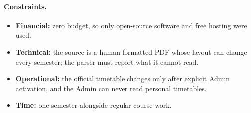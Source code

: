 \paragraph{Constraints.}
\begin{itemize}
\item \textbf{Financial:} zero budget, so only open-source software and free hosting were used.
\item \textbf{Technical:} the source is a human-formatted PDF whose layout can change every semester;
      the parser must report what it cannot read.
\item \textbf{Operational:} the official timetable changes only after explicit Admin activation, and
      the Admin can never read personal timetables.
\item \textbf{Time:} one semester alongside regular course work.
\end{itemize}
\newpage
